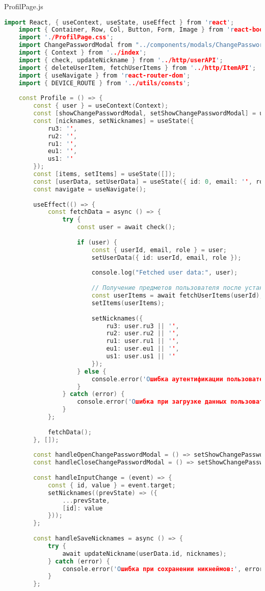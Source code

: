 ProfilPage.js
\begin{lstlisting}[language=C++]
	import React, { useContext, useState, useEffect } from 'react';
	import { Container, Row, Col, Button, Form, Image } from 'react-bootstrap';
	import './ProfilPage.css';
	import ChangePasswordModal from "../components/modals/ChangePasswordModal";
	import { Context } from '../index';
	import { check, updateNickname } from '../http/userAPI';
	import { deleteUserItem, fetchUserItems } from '../http/ItemAPI';
	import { useNavigate } from 'react-router-dom';
	import { DEVICE_ROUTE } from '../utils/consts';
	
	const Profile = () => {
		const { user } = useContext(Context);
		const [showChangePasswordModal, setShowChangePasswordModal] = useState(false);
		const [nicknames, setNicknames] = useState({
			ru3: '',
			ru2: '',
			ru1: '',
			eu1: '',
			us1: ''
		});
		const [items, setItems] = useState([]);
		const [userData, setUserData] = useState({ id: 0, email: '', role: '' });
		const navigate = useNavigate();
		
		useEffect(() => {
			const fetchData = async () => {
				try {
					const user = await check();
					
					if (user) {
						const { userId, email, role } = user;
						setUserData({ id: userId, email, role });
						
						console.log("Fetched user data:", user);
						
						// Получение предметов пользователя после установки userData
						const userItems = await fetchUserItems(userId);
						setItems(userItems);
						
						setNicknames({
							ru3: user.ru3 || '',
							ru2: user.ru2 || '',
							ru1: user.ru1 || '',
							eu1: user.eu1 || '',
							us1: user.us1 || ''
						});
					} else {
						console.error('Ошибка аутентификации пользователя');
					}
				} catch (error) {
					console.error('Ошибка при загрузке данных пользователя:', error);
				}
			};
			
			fetchData();
		}, []);
		
		const handleOpenChangePasswordModal = () => setShowChangePasswordModal(true);
		const handleCloseChangePasswordModal = () => setShowChangePasswordModal(false);
		
		const handleInputChange = (event) => {
			const { id, value } = event.target;
			setNicknames((prevState) => ({
				...prevState,
				[id]: value
			}));
		};
		
		const handleSaveNicknames = async () => {
			try {
				await updateNickname(userData.id, nicknames);
			} catch (error) {
				console.error('Ошибка при сохранении никнеймов:', error);
			}
		};
		

\end{lstlisting}
